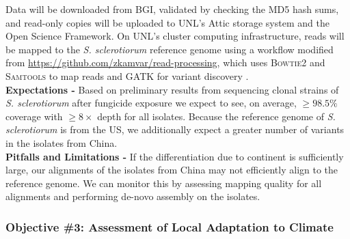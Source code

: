 \documentclass[12pt,letterpaper]{article}
\begin{document}
Data will be downloaded from BGI, validated by checking the MD5 hash sums, and read-only copies will be uploaded to UNL's Attic storage system and the Open Science Framework. 
On UNL's cluster computing infrastructure, reads will be mapped to the \textit{S. sclerotiorum} reference genome using a workflow modified from \url{https://github.com/zkamvar/read-processing}, which uses \textsc{Bowtie2} and \textsc{Samtools} to map reads and \textsc{GATK} for variant discovery \citep{langmead2012fast, li2009sequence, mckenna2010genome, derbyshire2017complete}.\\ 
\noindent \textbf{Expectations -}
Based on preliminary results from sequencing clonal strains of \textit{S. sclerotiorum} after fungicide exposure we expect to see, on average, $\geq98.5\%$ coverage with $\geq8\times$ depth for all isolates. Because the reference genome of \textit{S. sclerotiorum} is from the US, we additionally expect a greater number of variants in the isolates from China.\\
\noindent \textbf{Pitfalls and Limitations -}
If the differentiation due to continent is sufficiently large, our alignments of the isolates from China may not efficiently align to the reference genome. 
We can monitor this by assessing mapping quality for all alignments and performing de-novo assembly on the isolates.

\subsubsection{Objective \#3: Assessment of Local Adaptation to Climate}
\end{document}
